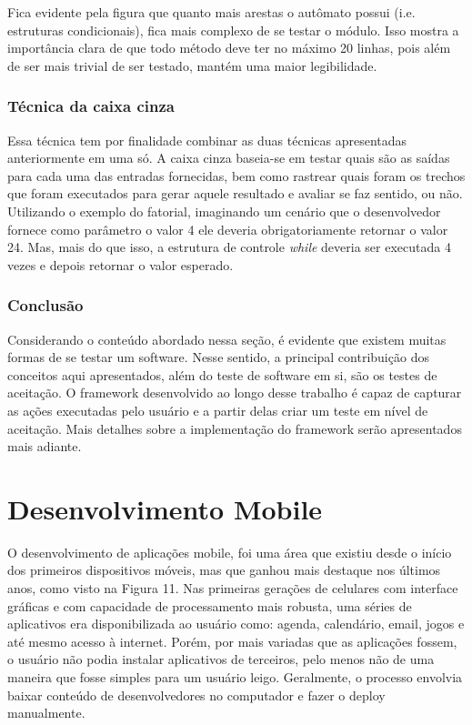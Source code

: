 \documentclass[
    12pt,       %
    openright,      %
    twoside,      %
    a4paper,      %
    english,      %
    french,       %
    spanish,      %
    brazil,       %
    ]{abntex2}
\begin{document}
              Fica evidente pela figura que quanto mais arestas o autômato possui (i.e. estruturas
              condicionais), fica mais complexo de se testar o módulo. Isso mostra a importância clara de
              que todo método deve ter no máximo 20 linhas, pois além de ser mais trivial de ser testado,
              mantém uma maior legibilidade.

          \subsection{Técnica da caixa cinza}
              Essa técnica tem por finalidade combinar as duas técnicas apresentadas anteriormente em uma
              só. A caixa cinza baseia-se em testar quais são as saídas para cada uma das entradas
              fornecidas, bem como rastrear quais foram os trechos que foram executados para gerar aquele
              resultado e avaliar se faz sentido, ou não. Utilizando o exemplo do fatorial, imaginando
              um cenário que o desenvolvedor fornece como parâmetro o valor 4 ele deveria obrigatoriamente
              retornar o valor 24. Mas, mais do que isso, a estrutura de controle \textit{while} deveria
              ser executada 4 vezes e depois retornar o valor esperado.

            \subsection{Conclusão}
              Considerando o conteúdo abordado nessa seção, é evidente que existem muitas formas de se testar um
              software. Nesse sentido, a principal contribuição dos conceitos aqui apresentados, além do
              teste de software em si, são os testes de aceitação. O framework desenvolvido ao longo
              desse trabalho é capaz de capturar as ações executadas pelo usuário e a partir delas criar
              um teste em nível de aceitação. Mais detalhes sobre a implementação do framework serão apresentados
              mais adiante.

  \chapter{Desenvolvimento Mobile}

      O desenvolvimento de aplicações mobile, foi uma área que existiu desde o início dos
      primeiros dispositivos móveis, mas que ganhou mais destaque nos últimos anos, como visto na
      Figura 11. Nas primeiras gerações de celulares com interface gráficas e com capacidade
      de processamento mais robusta, uma séries de aplicativos era disponibilizada ao usuário como:
      agenda, calendário, email, jogos e até mesmo acesso à internet. Porém, por mais variadas que as
      aplicações fossem, o usuário não podia instalar aplicativos de terceiros, pelo menos não de uma
      maneira que fosse simples para um usuário leigo. Geralmente, o processo envolvia baixar
      conteúdo de desenvolvedores no computador e fazer o deploy manualmente.
\end{document}
